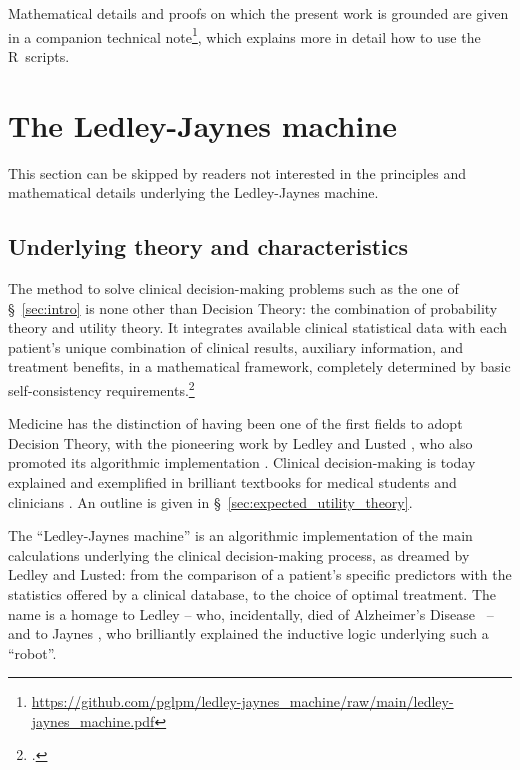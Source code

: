 \documentclass[utf8]{FrontiersinHarvard} %
\newcommand*{\sect}{\S}%
\newcommand*{\chaps}{chs}%
\renewcommand*{\|}[1][]{\nonscript\:#1\vert\nonscript\:\mathopen{}}
\newcommand*{\ad}{Alzheimer's Disease}
\newcommand*{\ljm}{Ledley-Jaynes machine}
\begin{document}
Mathematical details and proofs on which the present work is grounded are given in a companion technical note\footnote{\url{https://github.com/pglpm/ledley-jaynes\_machine/raw/main/ledley-jaynes\_machine.pdf}}, which explains more in detail how to use the R~scripts.

\newpage%
\section{The \ljm}
\label{sec:the_machine}

This section can be skipped by %
readers not interested in the principles and mathematical details underlying the \ljm.

\subsection{Underlying theory and characteristics}
\label{sec:the_machine_principles}

The method to solve clinical decision-making problems such as the one of \sect~\ref{sec:intro} %
is none other than Decision Theory: the combination of probability theory and utility theory. It integrates available clinical statistical data with each patient's unique combination of clinical results, auxiliary information, and treatment benefits, in a mathematical framework, completely determined by basic self-consistency requirements.\footnote{\citet[\chaps~13--14]{jaynes1994_r2003,vonneumannetal1944_r1955,cox1946,savage1954_r1972,luceetal1957,raiffaetal1961_r2000,raiffa1968_r1970,lindley1971_r1988,kreps1988}.}

Medicine has the distinction of having been one of the first fields to adopt Decision Theory, with the pioneering work by Ledley and Lusted \citeyearpar{ledleyetal1959,ledleyetal1959b,ledleyetal1960,lustedetal1960}, who also promoted its algorithmic implementation \citep[see especially \sect~1-5 p.~21]{ledley1959,ledley1960}. Clinical decision-making is today explained and exemplified in brilliant textbooks for medical students and clinicians \citep{weinsteinetal1980,soxetal1988_r2013,huninketal2001_r2014}. An outline is given in \sect~\ref{sec:expected_utility_theory}.

The \enquote{\ljm} is an algorithmic implementation of the main calculations underlying the clinical decision-making process, as dreamed by Ledley and Lusted: from the comparison of a patient's specific predictors with the statistics offered by a clinical database, to the choice of optimal treatment. The name is a homage to Ledley -- who, incidentally, died of \ad\ \citep{shahetal2013} -- and to Jaynes \citeyearpar{jaynes1994_r2003}, who brilliantly explained the inductive logic underlying such a \enquote{robot}.
\end{document}
